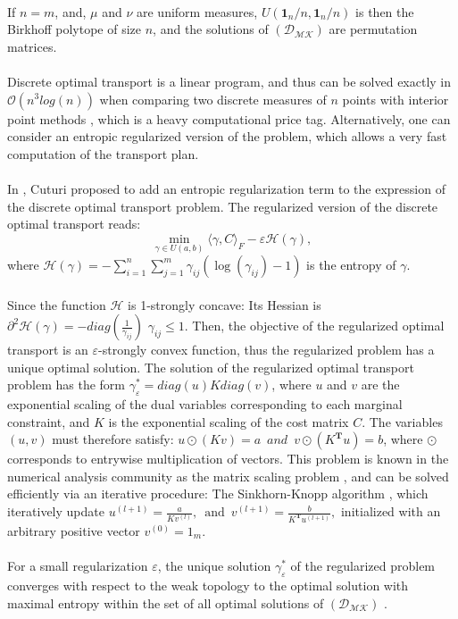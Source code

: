 \documentclass[conference]{IEEEtran}
\begin{document}
\\ If $n = m$, and, $\mu$ and $\nu$ are uniform measures, $U(\mathbf{1}_n/n,\mathbf{1}_n/n)$ is then the Birkhoff polytope of size $n$, and the solutions of $(\mathcal{D}_\mathcal{MK})$ are permutation matrices.
\\
\\ Discrete optimal transport is a linear program, and thus can be solved exactly in $\mathcal{O}(n^3 log(n))$ when comparing two discrete measures of $n$ points with interior point methods \cite{pele2009fast}, which is a heavy computational price tag. Alternatively, one can consider an entropic regularized version of the problem, which allows a very fast computation of the transport plan.
\\
\\ In \cite{cuturi2013sinkhorn}, Cuturi proposed to add an entropic regularization
term to the expression of the discrete optimal transport problem. The regularized version of the discrete optimal transport reads:
\begin{equation}
    \underset{\gamma \in U(a,b)}{\min}  \langle {\gamma},{C} \rangle _F - \varepsilon \mathcal{H}(\gamma)   ,
\end{equation}
where  $\mathcal{H}(\gamma) = - \sum_{i=1}^n \sum_{j=1}^m \gamma_{ij} (\log(\gamma_{ij}) - 1)  $ is the entropy of $\gamma$.
\\
\\ Since the function $\mathcal{H}$ is 1-strongly concave: Its Hessian is $\partial^2 \mathcal{H}(\gamma) = -diag(\frac{1}{\gamma_{ij}})$  $\gamma_{ij} \le 1.$ Then, the objective of the regularized optimal transport is an $\varepsilon$-strongly convex function, thus the regularized problem has a unique optimal solution.
The solution of the regularized optimal transport problem has the form ${\gamma_\varepsilon^*} = diag(u)Kdiag(v)$, where $u$ and $v$ are the exponential scaling of the dual variables corresponding to each marginal constraint, and $K$ is the exponential scaling of the cost matrix $C$. The variables $(u,v)$ must therefore satisfy: $u\odot (Kv) = a  \, \, \, and  \, \, \, v\odot(K^{\mathbf{T}}u) = b$, where $\odot$ corresponds to entrywise multiplication of vectors. This problem is known in the numerical analysis community as the matrix scaling problem \cite{nemirovski1999complexity}, and can be solved efficiently via an iterative procedure: The Sinkhorn-Knopp algorithm \cite{knight2008sinkhorn}, which iteratively update $ u^{(l+1)} = \frac{a}{Kv^{(l)}} , \, \, \, \text{and}  \, \, \,    v^{(l+1)} = \frac{b}{K^{\mathbf{T}}u^{(l+1)}},$ initialized with an arbitrary positive vector $v^{(0)}= 1_{m}$.
\\
\\ For a small regularization $\varepsilon$, the unique solution $\gamma_\varepsilon^*$ of the regularized problem converges with respect to the weak topology to the optimal solution with maximal entropy within the set of all optimal solutions of $(\mathcal{D}_\mathcal{MK})$ \cite{peyre2019computational}.
\end{document}
